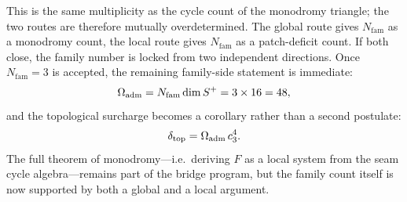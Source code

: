 This is the same multiplicity as the cycle count of the monodromy triangle; the two routes are therefore mutually overdetermined. The global route gives $N_{\mathrm{fam}}$ as a monodromy count, the local route gives $N_{\mathrm{fam}}$ as a patch-deficit count. If both close, the family number is locked from two independent directions. Once $N_{\mathrm{fam}}=3$ is accepted, the remaining family-side statement is immediate:
\[
\Omega_{\mathrm{adm}}=N_{\mathrm{fam}}\dim S^+=3\times 16=48,
\]
and the topological surcharge becomes a corollary rather than a second postulate:
\[
\delta_{\mathrm{top}}=\Omega_{\mathrm{adm}}\,c_3^4.
\]
The full theorem of monodromy---i.e.\ deriving $F$ as a local system from the seam cycle algebra---remains part of the bridge program, but the family count itself is now supported by both a global and a local argument.

